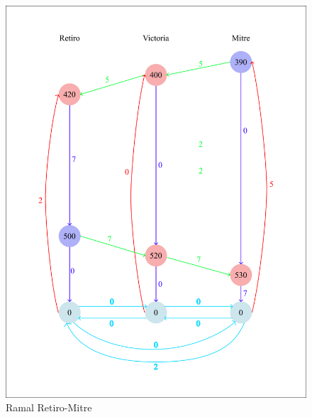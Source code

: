 \documentclass{article}
\begin{document}
\begin{figure}[H]
   \centering
    \begin{minipage}{0.45\textwidth}
        \centering
        \includegraphics[width=\textwidth]{Retiro-Mitre.png}
        \caption{Ramal Retiro-Mitre}
        \label{fig:grafico1}
    \end{minipage}
    \hfill
    \begin{minipage}{0.45\textwidth}
        \centering

\end{minipage}
\end{figure}
\end{document}
